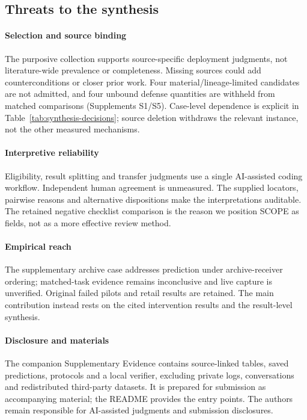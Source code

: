 \subsection{Threats to the synthesis}
\paragraph{Selection and source binding}
The purposive collection supports source-specific deployment judgments, not literature-wide prevalence or completeness. Missing sources could add counterconditions or closer prior work. Four material/lineage-limited candidates are not admitted, and four unbound defense quantities are withheld from matched comparisons (Supplements S1/S5). Case-level dependence is explicit in Table~\ref{tab:synthesis-decisions}; source deletion withdraws the relevant instance, not the other measured mechanisms.

\paragraph{Interpretive reliability}
Eligibility, result splitting and transfer judgments use a single AI-assisted coding workflow. Independent human agreement is unmeasured. The supplied locators, pairwise reasons and alternative dispositions make the interpretations auditable. The retained negative checklist comparison is the reason we position SCOPE as fields, not as a more effective review method.

\paragraph{Empirical reach}
The supplementary archive case addresses prediction under archive-receiver ordering; matched-task evidence remains inconclusive and live capture is unverified. Original failed pilots and retail results are retained. The main contribution instead rests on the cited intervention results and the result-level synthesis.

\paragraph{Disclosure and materials}
The companion Supplementary Evidence contains source-linked tables, saved predictions, protocols and a local verifier, excluding private logs, conversations and redistributed third-party datasets. It is prepared for submission as accompanying material; the README provides the entry points. The authors remain responsible for AI-assisted judgments and submission disclosures.
